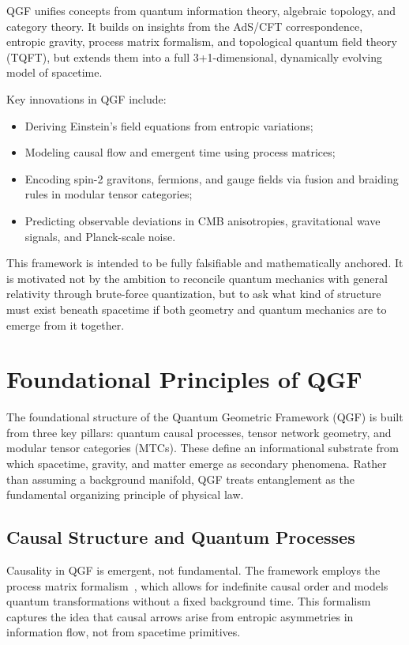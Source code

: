 \documentclass[11pt]{article}
\begin{document}
QGF unifies concepts from quantum information theory, algebraic topology, and category theory. It builds on insights from the AdS/CFT correspondence, entropic gravity, process matrix formalism, and topological quantum field theory (TQFT), but extends them into a full 3+1-dimensional, dynamically evolving model of spacetime.

Key innovations in QGF include:
\begin{itemize}
    \item Deriving Einstein's field equations from entropic variations;
    \item Modeling causal flow and emergent time using process matrices;
    \item Encoding spin-2 gravitons, fermions, and gauge fields via fusion and braiding rules in modular tensor categories;
    \item Predicting observable deviations in CMB anisotropies, gravitational wave signals, and Planck-scale noise.
\end{itemize}

This framework is intended to be fully falsifiable and mathematically anchored. It is motivated not by the ambition to reconcile quantum mechanics with general relativity through brute-force quantization, but to ask what kind of structure must exist beneath spacetime if both geometry and quantum mechanics are to emerge from it together.


\section{Foundational Principles of QGF}

The foundational structure of the Quantum Geometric Framework (QGF) is built from three key pillars: quantum causal processes, tensor network geometry, and modular tensor categories (MTCs). These define an informational substrate from which spacetime, gravity, and matter emerge as secondary phenomena. Rather than assuming a background manifold, QGF treats entanglement as the fundamental organizing principle of physical law.

\subsection{Causal Structure and Quantum Processes}

Causality in QGF is emergent, not fundamental. The framework employs the process matrix formalism~\cite{oreshkov2012quantum,chiribella2013quantum,costa2016quantum}, which allows for indefinite causal order and models quantum transformations without a fixed background time. This formalism captures the idea that causal arrows arise from entropic asymmetries in information flow, not from spacetime primitives.
\end{document}
